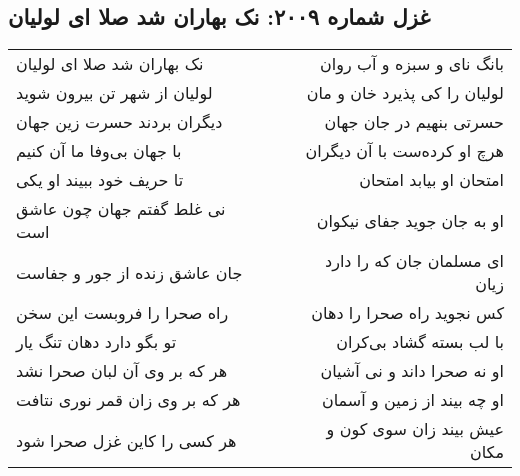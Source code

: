 \begin{center}
\section*{غزل شماره ۲۰۰۹: نک بهاران شد صلا ای لولیان}
\label{sec:2009}
\begin{longtable}{l p{0.5cm} r}
نک بهاران شد صلا ای لولیان
&&
بانگ نای و سبزه و آب روان
\\
لولیان از شهر تن بیرون شوید
&&
لولیان را کی پذیرد خان و مان
\\
دیگران بردند حسرت زین جهان
&&
حسرتی بنهیم در جان جهان
\\
با جهان بی‌وفا ما آن کنیم
&&
هرچ او کرده‌ست با آن دیگران
\\
تا حریف خود ببیند او یکی
&&
امتحان او بیابد امتحان
\\
نی غلط گفتم جهان چون عاشق است
&&
او به جان جوید جفای نیکوان
\\
جان عاشق زنده از جور و جفاست
&&
ای مسلمان جان که را دارد زیان
\\
راه صحرا را فروبست این سخن
&&
کس نجوید راه صحرا را دهان
\\
تو بگو دارد دهان تنگ یار
&&
با لب بسته گشاد بی‌کران
\\
هر که بر وی آن لبان صحرا نشد
&&
او نه صحرا داند و نی آشیان
\\
هر که بر وی زان قمر نوری نتافت
&&
او چه بیند از زمین و آسمان
\\
هر کسی را کاین غزل صحرا شود
&&
عیش بیند زان سوی کون و مکان
\\
\end{longtable}
\end{center}
